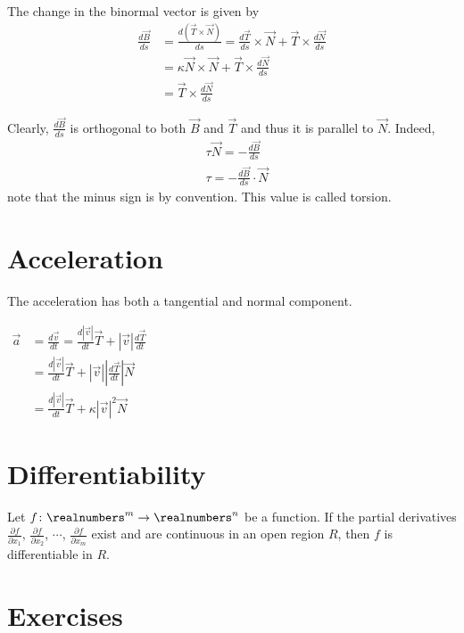 \documentclass[a4paper]{article}
\begin{document}
The change in the binormal vector is given by
\begin{align*}
    \frac{d\vec{B}}{ds} &= \frac{d(\vec{T} \times \vec{N})}{ds}
    = \frac{d\vec{T}}{ds} \times \vec{N} + \vec{T} \times \frac{d\vec{N}}{ds} \\
    &= \kappa\vec{N} \times \vec{N} + \vec{T} \times \frac{d\vec{N}}{ds} \\
    &= \vec{T} \times \frac{d\vec{N}}{ds}
\end{align*}

Clearly, \(\frac{d\vec{B}}{ds}\) is orthogonal to both \(\vec{B}\)
and \(\vec{T}\) and thus it is parallel to \(\vec{N}\).
Indeed,
\begin{align*}
    &\tau \vec{N} = -\frac{d\vec{B}}{ds} \\
    &\tau = -\frac{d\vec{B}}{ds} \cdot \vec{N}
\end{align*}
note that the minus sign is by convention.
This value is called torsion.

\section{Acceleration}

The acceleration has both a tangential and normal component.

$\begin{aligned} \vec{a} & =\frac{d \vec{v}}{d t}=\frac{d|\vec{v}|}{d t} \vec{T}+|\vec{v}| \frac{d \vec{T}}{d t} \\ & =\frac{d|\vec{v}|}{d t} \vec{T}+|\vec{v}|\left|\frac{d \vec{T}}{d t}\right| \vec{N} \\ & =\frac{d|\vec{v}|}{d t} \vec{T}+\kappa|\vec{v}|^2 \vec{N}\end{aligned}$

\section{Differentiability}


Let \(f\colon {\realnumbers}^m \to {\realnumbers}^n\) be a function.
If the partial derivatives \(\frac{\partial f}{\partial x_1}\), \(\frac{\partial f}{\partial x_2}\),
\(\cdots\), \(\frac{\partial f}{\partial x_m}\) exist and are continuous in an open region \(R\), then \(f\) is differentiable in \(R\).

\pagebreak

\section{Exercises}
\end{document}
